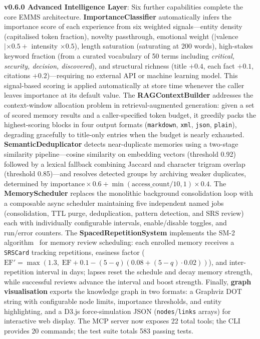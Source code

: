 \documentclass[conference]{IEEEtran}
\begin{document}
\textbf{v0.6.0 Advanced Intelligence Layer}: Six further capabilities complete the core EMMS architecture. \textbf{ImportanceClassifier} automatically infers the importance score of each experience from six weighted signals---entity density (capitalised token fraction), novelty passthrough, emotional weight ($|$valence$| \times 0.5 +$ intensity $\times 0.5$), length saturation (saturating at 200 words), high-stakes keyword fraction (from a curated vocabulary of 50 terms including \textit{critical, security, decision, discovered}), and structural richness (title $+0.4$, each fact $+0.1$, citations $+0.2$)---requiring no external API or machine learning model. This signal-based scoring is applied automatically at store time whenever the caller leaves importance at its default value. The \textbf{RAGContextBuilder} addresses the context-window allocation problem in retrieval-augmented generation: given a set of scored memory results and a caller-specified token budget, it greedily packs the highest-scoring blocks in four output formats (\texttt{markdown}, \texttt{xml}, \texttt{json}, \texttt{plain}), degrading gracefully to title-only entries when the budget is nearly exhausted. \textbf{SemanticDeduplicator} detects near-duplicate memories using a two-stage similarity pipeline---cosine similarity on embedding vectors (threshold 0.92) followed by a lexical fallback combining Jaccard and character trigram overlap (threshold 0.85)---and resolves detected groups by archiving weaker duplicates, determined by $\text{importance} \times 0.6 + \min(\text{access\_count}/10, 1) \times 0.4$. The \textbf{MemoryScheduler} replaces the monolithic background consolidation loop with a composable async scheduler maintaining five independent named jobs (consolidation, TTL purge, deduplication, pattern detection, and SRS review) each with individually configurable intervals, enable/disable toggles, and run/error counters. The \textbf{SpacedRepetitionSystem} implements the SM-2 algorithm~\cite{wozniak1990} for memory review scheduling: each enrolled memory receives a \texttt{SRSCard} tracking repetitions, easiness factor ($\text{EF}' = \max(1.3,\; \text{EF} + 0.1 - (5-q)(0.08 + (5-q) \cdot 0.02))$), and inter-repetition interval in days; lapses reset the schedule and decay memory strength, while successful reviews advance the interval and boost strength. Finally, \textbf{graph visualisation} exports the knowledge graph in two formats: a Graphviz DOT string with configurable node limits, importance thresholds, and entity highlighting, and a D3.js force-simulation JSON (\texttt{nodes}/\texttt{links} arrays) for interactive web display. The MCP server now exposes 22 total tools; the CLI provides 20 commands; the test suite totals 583 passing tests.
\end{document}
